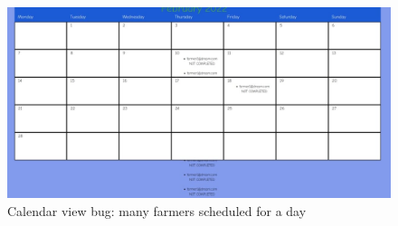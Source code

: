 \documentclass[table, 12pt]{article}
\begin{document}
\begin{figure}[H]
    \centering
    \includegraphics[scale=1.2]{assets/calendar_bug.jpg}
    \caption{Calendar view bug: many farmers scheduled for a day}
    \label{fig: calendar_bug}
\end{figure}
\end{document}
